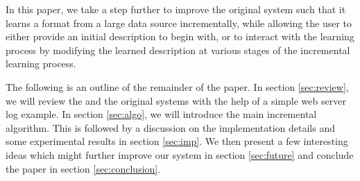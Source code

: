 In this paper, we take a step further to improve the original \learnpads{} system
such that it learns a format from a large data source incrementally,
while allowing the user to either provide an initial description to begin with,
or to interact with the learning process by modifying the learned description
at various stages of the incremental learning process.

The following is an outline of the remainder of the paper. In section \ref{sec:review},
we will review the \pads{} and the original \learnpads{} systems with the help of 
a simple web server log example. In section \ref{sec:algo}, we will introduce the main incremental
algorithm. This is followed by a discussion on the implementation details and
some experimental results in section \ref{sec:imp}. We then present a few interesting
ideas which might further improve our system in section \ref{sec:future} and conclude
the paper in section \ref{sec:conclusion}.

%
%
%
